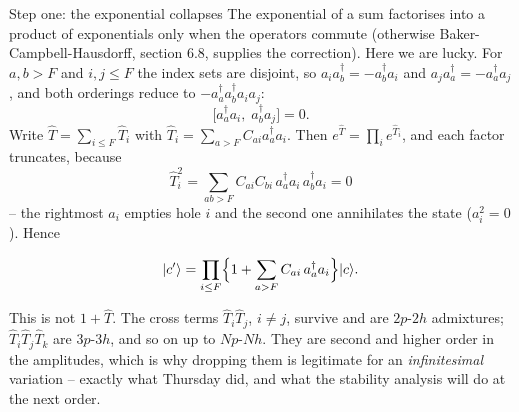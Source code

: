 \documentclass[aspectratio=169,10pt]{beamer}
\newcommand{\ket}[1]{\vert #1\rangle}
\begin{document}
\begin{frame}{Step one: the exponential collapses}
  \footnotesize
  The exponential of a sum factorises into a product of exponentials only when the operators commute (otherwise Baker-Campbell-Hausdorff, section 6.8, supplies the correction). Here we are lucky. For $a,b>F$ and $i,j\le F$ the index sets are disjoint, so $a_ia_b^{\dagger}=-a_b^{\dagger}a_i$ and $a_ja_a^{\dagger}=-a_a^{\dagger}a_j$, and both orderings reduce to $-a_a^{\dagger}a_b^{\dagger}a_ia_j$:
  \[
    \bigl[a_a^{\dagger}a_i,\;a_b^{\dagger}a_j\bigr]=0 .
  \]
  Write $\hat{T}=\sum_{i\le F}\hat{T}_i$ with $\hat{T}_i=\sum_{a>F}C_{ai}a_a^{\dagger}a_i$. Then $e^{\hat{T}}=\prod_ie^{\hat{T}_i}$, and each factor truncates, because
  \[
    \hat{T}_i^2=\sum_{ab>F}C_{ai}C_{bi}\,a_a^{\dagger}a_i\,a_b^{\dagger}a_i=0
  \]
  -- the rightmost $a_i$ empties hole $i$ and the second one annihilates the state ($a_i^2=0$). Hence
  \begin{block}{}
    \[
      \ket{c'}=\prod_{i\le F}\Bigl\{1+\sum_{a>F}C_{ai}\,a_a^{\dagger}a_i\Bigr\}\ket{c}.
    \]
  \end{block}
  \alert{This is not $1+\hat{T}$.} The cross terms $\hat{T}_i\hat{T}_j$, $i\ne j$, survive and are $2p$-$2h$ admixtures; $\hat{T}_i\hat{T}_j\hat{T}_k$ are $3p$-$3h$, and so on up to $Np$-$Nh$. They are second and higher order in the amplitudes, which is why dropping them is legitimate for an \emph{infinitesimal} variation -- exactly what Thursday did, and what the stability analysis will do at the next order.
\end{frame}
\end{document}

